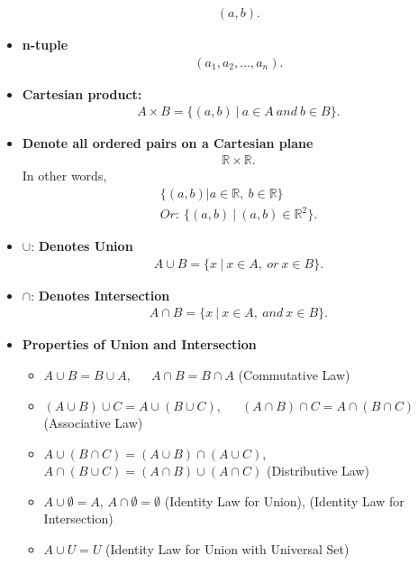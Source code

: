 \documentclass{report}
\begin{document}
\begin{itemize}
\begin{align*}
            (a,b)
          .\end{align*}
        \item \textbf{n-tuple}
          \begin{align*}
            (a_{1}, a_{2},...,a_{n})
          .\end{align*}
        \item \textbf{Cartesian product:}
          \begin{align*}
              A \times B = \{(a,b)\ |\ a \in A\ and\ b \in B\}
          .\end{align*}
        \item \textbf{Denote all ordered pairs on a Cartesian plane}
          \begin{align*}
            \mathbb{R} \times \mathbb{R}
          .\end{align*}
          In other words,
          \begin{align*}
            \{(a,b) | a \in \mathbb{R},\ b \in \mathbb{R}\}  \\
            Or:\ \{(a,b)\ |\ (a,b) \in \mathbb{R}^{2}\}
          .\end{align*}
        \item $\cup$: \textbf{Denotes Union}
          \begin{align*}
            A \cup B = \{x\ |\ x \in A,\ or\ x \in B\}
          .\end{align*}
        \item $\cap$: \textbf{Denotes Intersection}
          \begin{align*}
            A \cap B = \{x\ |\ x \in A,\ and\ x \in B\}
          .\end{align*}
        \item \textbf{Properties of Union and Intersection}
        \begin{itemize}
          \item $A \cup B  = B \cup A $, $\quad $ $A \cap B  = B \cap A$ (Commutative Law)
          \item $(A \cup B) \cup C  = A \cup (B\cup C)$, $\quad$ $(A \cap B) \cap C = A \cap (B\cap C) $ (Associative Law)
          \item  $A \cup (B\cap C) = (A \cup B) \cap (A \cup C) $, $\quad$ $A \cap (B \cup C)  = (A \cap B) \cup (A \cap C)$ (Distributive Law)
          \item $A \cup \emptyset  = A$, \quad $A \cap \emptyset = \emptyset $ (Identity Law for Union), (Identity Law for Intersection)
          \item $A \cup U = U $ (Identity Law for Union with Universal Set)

\end{itemize}
\end{itemize}
\end{document}

